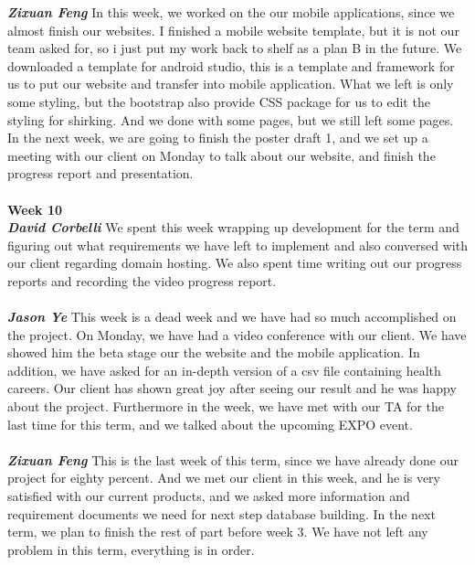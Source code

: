 \documentclass[onecolumn, draftclsnofoot,10pt, compsoc]{IEEEtran}
\begin{document}
\textbf{\textit{Zixuan Feng}}
In this week, we worked on the our mobile applications, since we almost finish our websites. I finished a mobile website template, but it is not our team asked for, so i just put my work back to shelf as a plan B in the future. We downloaded a template for android studio, this is a template and framework for us to put our website and transfer into mobile application. What we left is only some styling, but the bootstrap also provide CSS package for us to edit the styling for shirking. And we done with some pages, but we still left some pages. In the next week, we are going to finish the poster draft 1, and we set up a meeting with our client on Monday to talk about our website, and finish the progress report and presentation.\\ \\
\textbf{Week 10}
\\ \textbf{\textit{David Corbelli}}
We spent this week wrapping up development for the term and figuring out what requirements we have left to implement and also conversed with our client regarding domain hosting. We also spent time writing out our progress reports and recording the video progress report.\\ \\
\textbf{\textit{Jason Ye}}
This week is a dead week and we have had so much accomplished on the project. On Monday, we have had a video conference with our client. We have showed him the beta stage our the website and the mobile application. In addition, we have asked for an in-depth version of a csv file containing health careers. Our client has shown great joy after seeing our result and he was happy about the project. Furthermore in the week, we have met with our TA for the last time for this term, and we talked about the upcoming EXPO event.\\ \\
\textbf{\textit{Zixuan Feng}}
This is the last week of this term, since we have already done our project for eighty percent. And we met our client in this week, and he is very satisfied with our current products, and we asked more information and requirement documents we need for next step database building. In the next term, we plan to finish the rest of part before week 3. We have not left any problem in this term, everything is in order.\\ \\
\end{document}
